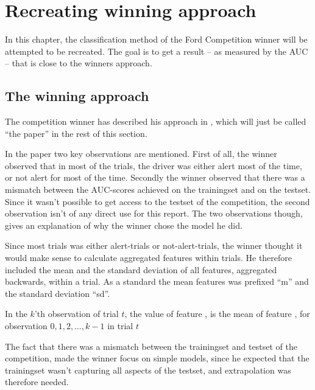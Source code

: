 \chapter{Recreating winning approach}\label{sec:recreating}
In this chapter, the classification method of the Ford Competition winner will be attempted to be recreated. The goal is to get a result -- as measured by the AUC -- that is close to the winners approach.

\section{The winning approach}
The competition winner has described his approach in \citet{inference_winning_approach}, which will just be called ``the paper'' in the rest of this section. \par
In the paper two key observations are mentioned. First of all, the winner observed that in most of the trials, the driver was either alert most of the time, or not alert for most of the time. Secondly the winner observed that there was a mismatch between the AUC-scores achieved on the trainingset and on the testset. Since it wasn't possible to get access to the testset of the competition, the second observation isn't of any direct use for this report. The two observations though, gives an explanation of why the winner chose the model he did. \par
Since most trials was either alert-trials or not-alert-trials, the winner thought it would make sense to calculate aggregated features within trials. He therefore included the mean and the standard deviation of all features, aggregated backwards, within a trial. As a standard the mean features was prefixed ``m'' and the standard deviation ``sd''. 
\begin{Exa}
    In the $k$'th observation of trial $t$, the value of feature , is the mean of feature , for observation $0,1,2,\dots,k-1$ in trial $t$
\end{Exa}
The fact that there was a mismatch between the trainingset and testset of the competition, made the winner focus on simple models, since he expected that the trainingset wasn't capturing all aspects of the testset, and extrapolation was therefore needed.

